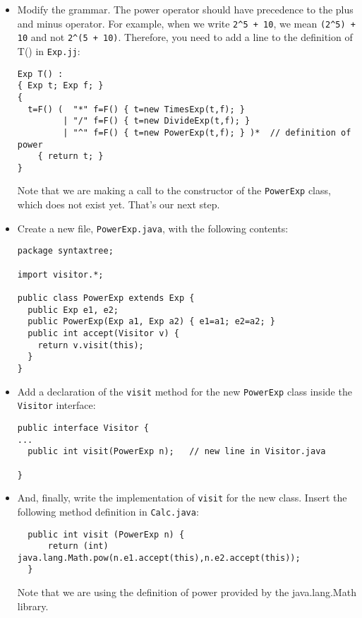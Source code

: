 \documentclass{article}
\begin{document}
\begin{itemize}
\item Modify the grammar. The power operator should have precedence to the plus and minus operator. For example, when we write \verb?2^5 + 10?, we mean \verb?(2^5) + 10? and not \verb?2^(5 + 10)?. Therefore, you need to add a line to the definition of T() in {\tt Exp.jj}:

\begin{verbatim}
Exp T() :
{ Exp t; Exp f; }
{
  t=F() (  "*" f=F() { t=new TimesExp(t,f); }
         | "/" f=F() { t=new DivideExp(t,f); } 
         | "^" f=F() { t=new PowerExp(t,f); } )*  // definition of power
    { return t; }
}
\end{verbatim}

Note that we are making a call to the constructor of the {\tt PowerExp} class, which does not exist yet. That's our next step.

\item Create a new file, {\tt PowerExp.java}, with the following contents:

\begin{verbatim}
package syntaxtree;

import visitor.*;

public class PowerExp extends Exp {
  public Exp e1, e2;
  public PowerExp(Exp a1, Exp a2) { e1=a1; e2=a2; }
  public int accept(Visitor v) { 
    return v.visit(this);
  }
}
\end{verbatim}

\item Add a declaration of the {\tt visit} method for the new {\tt PowerExp} class inside the {\tt Visitor} interface:

\begin{verbatim}
public interface Visitor {
...
  public int visit(PowerExp n);   // new line in Visitor.java

}
\end{verbatim}


\item And, finally, write the implementation of {\tt visit} for the new class. Insert the following method definition in {\tt Calc.java}:

\begin{verbatim}
  public int visit (PowerExp n) {
      return (int) java.lang.Math.pow(n.e1.accept(this),n.e2.accept(this));
  }
\end{verbatim}

Note that we are using the definition of power provided by the java.lang.Math library.

\end{itemize}
\end{document}
